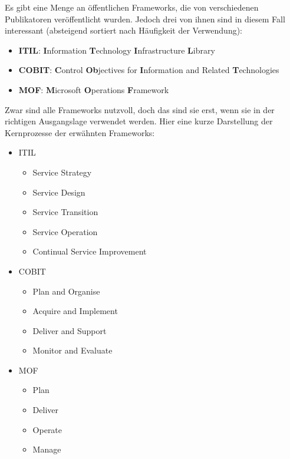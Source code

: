 Es gibt eine Menge an öffentlichen Frameworks, die von verschiedenen Publikatoren
veröffentlicht wurden. Jedoch drei von ihnen sind in diesem Fall interessant 
(absteigend sortiert nach Häufigkeit der Verwendung):
\newline
\begin{itemize}
    \item \textbf{ITIL}:  \textbf{I}nformation \textbf{T}echnology \textbf{I}nfrastructure
                          \textbf{L}ibrary
    \item \textbf{COBIT}: \textbf{C}ontrol \textbf{Ob}jectives for \textbf{I}nformation 
                          and Related \textbf{T}echnologies
    \item \textbf{MOF}:   \textbf{M}icrosoft \textbf{O}perations \textbf{F}ramework
\end{itemize}
\noindent
\newline
Zwar sind alle Frameworks nutzvoll, doch das sind sie erst, wenn sie in der richtigen
Ausgangslage verwendet werden. 
\newline
Hier eine kurze Darstellung der Kernprozesse der erwähnten Frameworks:

\begin{itemize}
    \item ITIL
    \begin{itemize}
        \item Service Strategy
        \item Service Design
        \item Service Transition
        \item Service Operation
        \item Continual Service Improvement
    \end{itemize}
    \item COBIT
    \begin{itemize}
        \item Plan and Organise
        \item Acquire and Implement
        \item Deliver and Support
        \item Monitor and Evaluate
    \end{itemize}
    \item MOF
    \begin{itemize}
        \item Plan
        \item Deliver
        \item Operate
        \item Manage
    \end{itemize}
\end{itemize}


